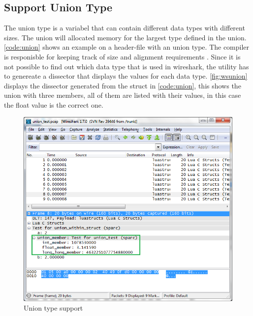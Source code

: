\subsection{Support Union Type}
The \gls{union} type is a variabel that can contain different data types with 
different sizes. The \gls{union} will allocated memory for the largest type defined 
in the \gls{union}. \autoref{code:union} shows an example on a \gls{header}-file with an 
\gls{union} type. The compiler is responisble for keeping track of size and 
alignment requirements\cite[p.147]{Kerninghan1988} . Since it is not 
possible to find out which data type that is used in \Gls{wireshark}, the \gls{utility} 
has to genereate a \gls{dissector} that displays the values for each data type. 
\autoref{fig:wsunion} displays the \gls{dissector} generated from the \gls{struct} in 
\autoref{code:union}, this shows the \gls{union} with three \glspl{member}, all of them are 
listed with their values, in this case the \gls{float} value is the correct one.

\begin{figure}[ht]
	\center
	\includegraphics[width=\textwidth]{./sprints/img/wireshark_union}
	\caption{Union type support\label{fig:wsunion}}
\end{figure}



